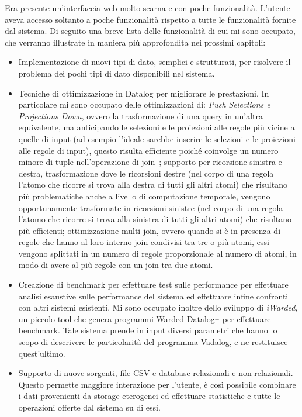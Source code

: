 Era presente un'interfaccia web molto scarna e con poche funzionalità. L'utente aveva accesso soltanto a poche funzionalità rispetto a tutte le funzionalità fornite dal sistema. \medskip  \newline
Di seguito una breve lista delle funzionalità di cui mi sono occupato, che verranno illustrate in maniera più approfondita nei prossimi capitoli:
\begin{itemize}
	\item Implementazione di nuovi tipi di dato, semplici e strutturati, per risolvere il problema dei pochi tipi di dato disponibili nel sistema.
	\item Tecniche di ottimizzazione in Datalog per migliorare le prestazioni. In particolare mi sono occupato delle ottimizzazioni di: \emph{Push Selections e Projections Down}, ovvero la trasformazione di una query in un'altra equivalente, ma anticipando le selezioni e le proiezioni alle regole più vicine a quelle di input (ad esempio l'ideale sarebbe inserire le selezioni e le proiezioni alle regole di input), questo risulta efficiente poiché coinvolge un numero minore di tuple nell'operazione di join~\cite{atzeni2006basi}; supporto per ricorsione sinistra e destra, trasformazione dove le ricorsioni destre (nel corpo di una regola l'atomo che ricorre si trova alla destra di tutti gli altri atomi) che risultano più problematiche anche a livello di computazione temporale, vengono opportunamente trasformate in ricorsioni sinistre (nel corpo di una regola l'atomo che ricorre si trova alla sinistra di tutti gli altri atomi) che risultano più efficienti; ottimizzazione multi-join, ovvero quando si è in presenza di regole che hanno al loro interno join condivisi tra tre o più atomi, essi vengono splittati in un numero di regole proporzionale al numero di atomi, in modo di avere al più regole con un join tra due atomi.
	\item Creazione di benchmark per effettuare test sulle performance per effettuare analisi esaustive sulle performance del sistema ed effettuare infine confronti con altri sistemi esistenti. Mi sono occupato inoltre dello sviluppo di \textit{iWarded}, un piccolo tool che genera programmi Warded Datalog$^\pm $ per effettuare benchmark. Tale sistema prende in input diversi parametri che hanno lo scopo di descrivere le particolarità del programma Vadalog, e ne restituisce quest'ultimo.
	\item Supporto di nuove sorgenti, file CSV e database relazionali e non relazionali. Questo permette maggiore interazione per l'utente, è così possibile combinare i dati provenienti da storage eterogenei ed effettuare statistiche e tutte le operazioni offerte dal sistema su di essi.

\end{itemize}
